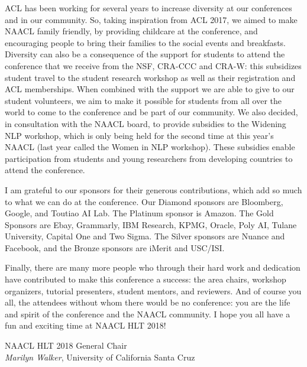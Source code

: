 ACL has been working for several years to increase diversity at our
conferences and in our community. So, taking inspiration from ACL 2017,
we aimed to make NAACL family friendly, by providing childcare at the
conference, and encouraging people to bring their families to the
social events and breakfasts. Diversity can also be a consequence of
the support for students to attend the conference that we receive from
the NSF, CRA-CCC and CRA-W: this subsidizes student travel to the student
research workshop as well as their registration and ACL
memberships. When combined with the support we are able to give to our
student volunteers, we aim to make it possible for students from all
over the world to come to the conference and be part of our
community. We also decided, in consultation with the NAACL board, to
provide subsidies to the Widening NLP workshop, which is only being
held for the second time at this year's NAACL (last year called the
Women in NLP workshop).  These subsidies enable participation from
students and young researchers from developing countries to attend the
conference.


I am grateful to our sponsors for their generous contributions, which
add so much to what we can do at the conference. Our Diamond sponsors
are Bloomberg, Google, and Toutiao AI Lab. The Platinum
sponsor is Amazon. The Gold Sponsors are Ebay, Grammarly, IBM Research, KPMG, Oracle, Poly AI,
Tulane University, Capital One and Two Sigma. The Silver sponsors are Nuance and
Facebook, and the Bronze sponsors are iMerit and USC/ISI.

Finally, there are many more people who through their hard work and
dedication have contributed to make this conference a success: the
area chairs, workshop organizers, tutorial presenters, student
mentors, and reviewers. And of course you all, the attendees without
whom there would be no conference: you are the life and spirit of the
conference and the NAACL community. I hope you all have a
fun and exciting time at NAACL HLT 2018!

\vskip 0.25in
\noindent NAACL HLT 2018 General Chair \\
{\it Marilyn Walker}, University of California Santa Cruz 
